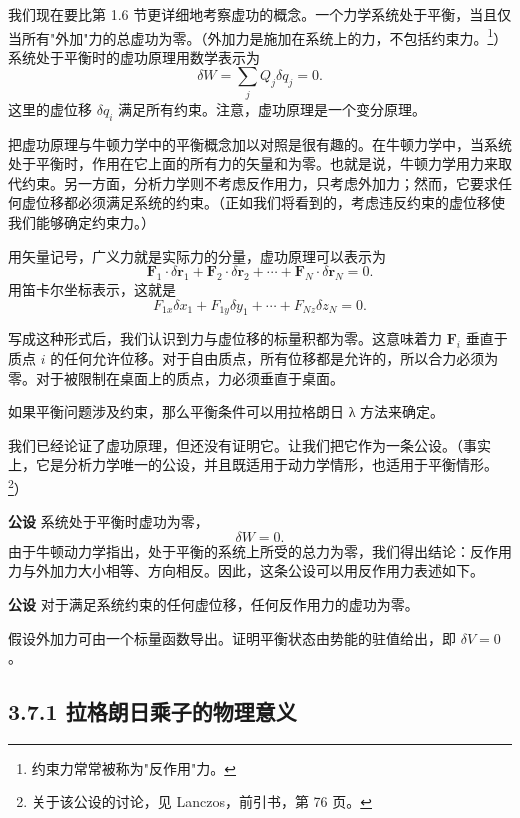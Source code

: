 我们现在要比第 1.6 节更详细地考察虚功的概念。一个力学系统处于平衡，当且仅当所有"外加"力的总虚功为零。（外加力是施加在系统上的力，不包括约束力。\footnote{约束力常常被称为"反作用"力。}）系统处于平衡时的虚功原理用数学表示为
$$
\delta W = \sum_j Q_j\delta q_j = 0.
$$
这里的虚位移 $\delta q_i$ 满足所有约束。注意，虚功原理是一个变分原理。

把虚功原理与牛顿力学中的平衡概念加以对照是很有趣的。在牛顿力学中，当系统处于平衡时，作用在它上面的所有力的矢量和为零。也就是说，牛顿力学用力来取代约束。另一方面，分析力学则不考虑反作用力，只考虑外加力；然而，它要求任何虚位移都必须满足系统的约束。（正如我们将看到的，考虑违反约束的虚位移使我们能够确定约束力。）

用矢量记号，广义力就是实际力的分量，虚功原理可以表示为
$$
\mathbf{F}_1\cdot\delta\mathbf{r}_1 + \mathbf{F}_2\cdot\delta\mathbf{r}_2 + \cdots + \mathbf{F}_N\cdot\delta\mathbf{r}_N = 0.
$$
用笛卡尔坐标表示，这就是
$$
F_{1x}\delta x_1 + F_{1y}\delta y_1 + \cdots + F_{Nz}\delta z_N = 0.
$$

写成这种形式后，我们认识到力与虚位移的标量积都为零。这意味着力 $\mathbf{F}_i$ 垂直于质点 $i$ 的任何允许位移。对于自由质点，所有位移都是允许的，所以合力必须为零。对于被限制在桌面上的质点，力必须垂直于桌面。

如果平衡问题涉及约束，那么平衡条件可以用拉格朗日 λ 方法来确定。

我们已经论证了虚功原理，但还没有证明它。让我们把它作为一条公设。（事实上，它是分析力学唯一的公设，并且既适用于动力学情形，也适用于平衡情形。\footnote{关于该公设的讨论，见 Lanczos，前引书，第 76 页。}）

\textbf{公设} 系统处于平衡时虚功为零，
$$
\delta W = 0.
$$
由于牛顿动力学指出，处于平衡的系统上所受的总力为零，我们得出结论：反作用力与外加力大小相等、方向相反。因此，这条公设可以用反作用力表述如下。

\textbf{公设} 对于满足系统约束的任何虚位移，任何反作用力的虚功为零。

\begin{exercise}
假设外加力可由一个标量函数导出。证明平衡状态由势能的驻值给出，即 $\delta V = 0$。
\end{exercise}

\subsection*{3.7.1  拉格朗日乘子的物理意义}

